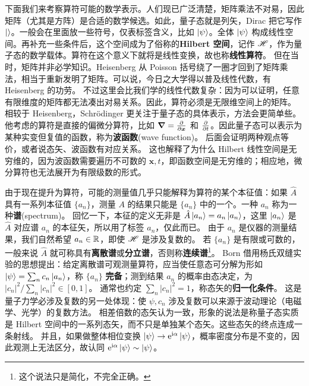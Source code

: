 下面我们来考察算符可能的数学表示。人们现已广泛清楚，矩阵乘法不对易，因此矩阵（尤其是方阵）是合适的数学候选。如此，量子态就是列矢，Dirac 把它写作 $\ket{}$。一般会在里面放一些符号，仅表标签含义，比如 $\ket{\psi}$。全体 $\ket{\psi}$ 构成线性空间。再补充一些条件后，这个空间成为了俗称的\textbf{Hilbert 空间}，记作 $\mathscr{H}$，作为量子态的数学载体。算符在这个意义下就将是线性变换，故也称\textbf{线性算符}。
但在当时，矩阵并非必学知识。Heisenberg 从 Poisson 括号绕了一圈才回到了矩阵乘法，相当于重新发明了矩阵。可以说，今日之大学得以普及线性代数，有 Heisenberg 的功劳。
不过这里会比我们学的线性代数复杂：因为可以证明，任意有限维度的矩阵都无法凑出对易关系。因此，算符必须是无限维空间上的矩阵。
相较于 Heisenberg，Schr\"odinger 更关注于量子态的具体表示，方法会更简单些。
他考虑的算符是直接的偏微分算符，比如 $\grad=\pdv{\bm x}$ 和 $\pdv{t}$。因此量子态可以表示为某种实变但复值的函数，称为\textbf{波函数}(wave function)。
后面会证明两种观点等价，或者说态矢、波函数有对应关系。
这也解释了为什么 Hilbert 线性空间是无穷维的，因为波函数需要遍历不可数的 $\bm x,t$，即函数空间是无穷维的；相应地，微分算符也无法展开为有限级数的形式。

由于现在提升为算符，可能的测量值几乎只能解释为算符的某个本征值：如果 $\hat A$ 具有一系列本征值 $\{a_n\}$，测量 $A$ 的结果只能是 $\{a_n\}$ 中的一个。一种 $a_n$ 称为一种\textbf{谱}(spectrum)。
回忆一下，本征的定义无非是 $\hat A \ket{a_n}=a_n \ket{a_n}$，这里 $\ket{a_n}$ 是 $\hat A$ 对应谱 $a_n$ 的本征矢，所以用了标签 $a_n$，仅此而已。
由于 $a_n$ 是仪器的测量结果，我们自然希望 $a_n\in\mathbb{R}$，即使 $\mathscr{H}$ 是涉及复数的。
若 $\{a_n\}$ 是有限或可数的，一般来说 $\hat A$ 就可称具有\textbf{离散谱}或\textbf{分立谱}，否则称\textbf{连续谱}\footnote{这个说法只是简化，不完全正确。}。
Born 借用杨⽒双缝实验的思想提出：给定离散谱可观测量算符，应当使任意态可分解为形如 $\ket\psi=\sum_n c_n \ket{a_n}$，称 $\{a_n\}$ \textbf{完备}；测到结果 $a_n$ 的概率由态决定，为 $|c_n|^2/\sum_n |c_n|^2 \in [0,1]$。
通常也约定 $\sum_n |c_n|^2=1$，称态矢的\textbf{归一化条件}。
这是量子力学必涉及复数的另一处体现：使 $\psi,c_n$ 涉及复数可以来源于波动理论（电磁学、光学）的复数方法。
相差倍数的态矢认为一致，形象的说法是称量子态实质是 Hilbert 空间中的一系列态矢，而不只是单独某个态矢。这些态矢的终点连成一条射线。
并且，如果做整体相位变换 $\ket\psi \to \mathrm{e}^{\mathrm{i}\alpha}\ket\psi$，概率密度分布是不变的，因此观测上无法区分，故认同 $\mathrm{e}^{\mathrm{i}\alpha}\ket\psi\sim\ket\psi$。


